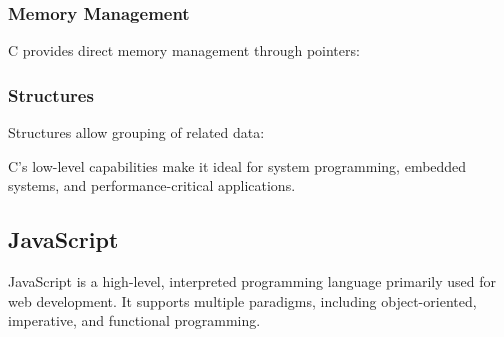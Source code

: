 \hypertarget{memory-management}{%
\subsubsection{Memory Management}\label{memory-management}}

C provides direct memory management through pointers:

\begin{Shaded}
\begin{Highlighting}[]
\NormalTok{;}
\end{Highlighting}
\end{Shaded}

\hypertarget{structures}{%
\subsubsection{Structures}\label{structures}}

Structures allow grouping of related data:

\begin{Shaded}
\begin{Highlighting}[]
    \NormalTok{ name[}\NormalTok{];}
\NormalTok{\};}

    \NormalTok{, }\NormalTok{\};}
     \NormalTok{;}
\NormalTok{\}}
\end{Highlighting}
\end{Shaded}

C's low-level capabilities make it ideal for system programming,
embedded systems, and performance-critical applications.

\hypertarget{javascript}{%
\subsection{JavaScript}\label{javascript}}

JavaScript is a high-level, interpreted programming language primarily
used for web development. It supports multiple paradigms, including
object-oriented, imperative, and functional programming.


